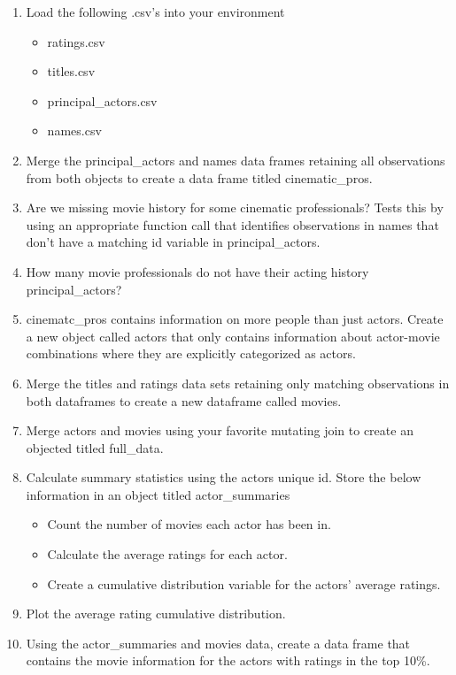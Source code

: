 \documentclass[]{book}
\providecommand{\tightlist}{%
  \setlength{\itemsep}{0pt}\setlength{\parskip}{0pt}}
\theoremstyle{definition}
\theoremstyle{definition}
\theoremstyle{definition}
\theoremstyle{remark}
\begin{document}
\begin{enumerate}
\def\labelenumi{\arabic{enumi}.}
\item
  Load the following .csv's into your environment

  \begin{itemize}
  \tightlist
  \item
    ratings.csv
  \item
    titles.csv
  \item
    principal\_actors.csv
  \item
    names.csv
  \end{itemize}
\item
  Merge the principal\_actors and names data frames retaining all observations from both objects to create a data frame titled cinematic\_pros.
\item
  Are we missing movie history for some cinematic professionals? Tests this by using an appropriate function call that identifies observations in names that don't have a matching id variable in principal\_actors.
\item
  How many movie professionals do not have their acting history principal\_actors?
\item
  cinematc\_pros contains information on more people than just actors. Create a new object called actors that only contains information about actor-movie combinations where they are explicitly categorized as actors.
\item
  Merge the titles and ratings data sets retaining only matching observations in both dataframes to create a new dataframe called movies.
\item
  Merge actors and movies using your favorite mutating join to create an objected titled full\_data.
\item
  Calculate summary statistics using the actors unique id. Store the below information in an object titled actor\_summaries

  \begin{itemize}
  \tightlist
  \item
    Count the number of movies each actor has been in.
  \item
    Calculate the average ratings for each actor.
  \item
    Create a cumulative distribution variable for the actors' average ratings.
  \end{itemize}
\item
  Plot the average rating cumulative distribution.
\item
  Using the actor\_summaries and movies data, create a data frame that contains the movie information for the actors with ratings in the top 10\%.
\end{enumerate}
\end{document}
